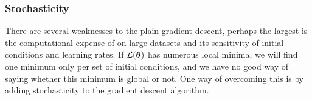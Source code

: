 


        

    \subsubsection{Stochasticity}\label{sec:stochasticity}
        There are several weaknesses to the plain gradient descent, perhaps the largest is the computational expense of on large datasets and its sensitivity of initial conditions and learning rates. If $\mathcal{L}(\boldsymbol{\theta})$ has numerous local minima, we will find one minimum only per set of initial conditions, and we have no good way of saying whether this minimum is global or not. One way of overcoming this is by adding stochasticity to the gradient descent algorithm. 

